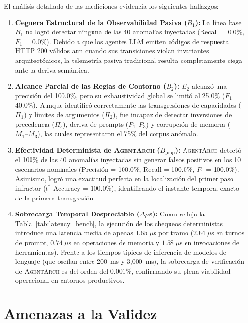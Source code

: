 \documentclass[conference]{IEEEtran}
\begin{document}
El an\'alisis detallado de las mediciones evidencia los siguientes hallazgos:
\begin{enumerate}
    \item \textbf{Ceguera Estructural de la Observabilidad Pasiva ($B_1$):} La l\'inea base $B_1$ no logr\'o detectar ninguna de las 40 anomal\'ias inyectadas (Recall = 0.0\%, $F_1$ = 0.0\%). Debido a que los agentes LLM emiten c\'odigos de respuesta HTTP 200 v\'alidos aun cuando sus transiciones violan invariantes arquitect\'onicos, la telemetr\'ia pasiva tradicional resulta completamente ciega ante la deriva sem\'antica.
    \item \textbf{Alcance Parcial de las Reglas de Contorno ($B_2$):} $B_2$ alcanz\'o una precisi\'on del 100.0\%, pero su exhaustividad global se limit\'o al 25.0\% ($F_1$ = 40.0\%). Aunque identific\'o correctamente las transgresiones de capacidades ($\Pi_1$) y l\'imites de argumentos ($\Pi_2$), fue incapaz de detectar inversiones de precedencia ($\Pi_3$), deriva de prompts ($P_1\text{--}P_3$) y corrupci\'on de memoria ($M_1\text{--}M_3$), las cuales representaron el 75\% del corpus an\'omalo.
    \item \textbf{Efectividad Determinista de \textsc{AgentArch} ($B_{\text{prop}}$):} \textsc{AgentArch} detect\'o el 100\% de las 40 anomal\'ias inyectadas sin generar falsos positivos en los 10 escenarios nominales (Precisi\'on = 100.0\%, Recall = 100.0\%, $F_1$ = 100.0\%). Asimismo, logr\'o una exactitud perfecta en la localizaci\'on del primer paso infractor ($t^*$ Accuracy = 100.0\%), identificando el instante temporal exacto de la primera transgresi\'on.
    \item \textbf{Sobrecarga Temporal Despreciable ($\Delta \mu$s):} Como refleja la Tabla~\ref{tab:latency_bench}, la ejecuci\'on de los chequeos deterministas introduce una latencia media de apenas $1.65\;\mu$s por tramo ($2.64\;\mu$s en turnos de prompt, $0.74\;\mu$s en operaciones de memoria y $1.58\;\mu$s en invocaciones de herramientas). Frente a los tiempos t\'ipicos de inferencia de modelos de lenguaje (que oscilan entre 200~ms y 3,000~ms), la sobrecarga de verificaci\'on de \textsc{AgentArch} es del orden del 0.001\%, confirmando su plena viabilidad operacional en entornos productivos.
\end{enumerate}

\section{Amenazas a la Validez}
\end{document}
